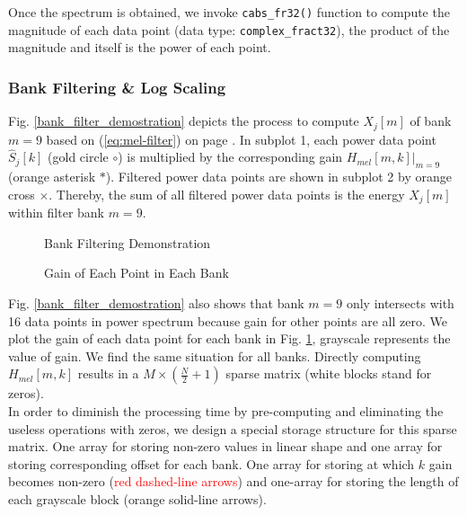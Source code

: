 Once the spectrum is obtained, we invoke \texttt{cabs\_fr32()} function to compute the magnitude of each data point (data type: \texttt{complex\_fract32}), the product of the magnitude and itself is the power of each point.


\subsubsection{Bank Filtering \& Log Scaling}

Fig. \ref{bank_filter_demostration} depicts the process to compute $X_j[m]$ of bank $m = 9$ based on (\ref{eq:mel-filter}) on page \pageref{eq:mel-filter}. In subplot 1, each power data point $\hat{S}_j[k]$ (\textcolor{gold_matlab}{gold circle $\circ$}) is multiplied by the corresponding gain $H_{mel}[m, k]|_{m=9}$ (\textcolor{orange_matlab}{orange asterisk $*$}). Filtered power data points are shown in subplot 2 by \textcolor{orange_matlab}{orange cross $\times$}. Thereby, the sum of all filtered power data points is the energy $X_j[m]$ within filter bank $m = 9$.

\begin{figure}[H]
\begin{minipage}[t]{0.5\linewidth}
\centering
{}
\caption{Bank Filtering Demonstration}
\label{bank_filter_demostration}
\end{minipage}
\begin{minipage}[t]{0.5\linewidth}
\centering
{}
\caption{Gain of Each Point in Each Bank}
\label{mel_filter_bank_gain}
\end{minipage}
\end{figure}

Fig. \ref{bank_filter_demostration} also shows that bank $m=9$ only intersects with 16 data points in power spectrum because gain for other points are all zero. We plot the gain of each data point for each bank in Fig. \ref{mel_filter_bank_gain}, grayscale represents the value of gain. We find the same situation for all banks. Directly computing $H_{mel}[m, k]$ results in a $M \times \left( \frac{N}{2} + 1 \right)$ sparse matrix (white blocks stand for zeros).\\

In order to diminish the processing time by pre-computing and eliminating the useless operations with zeros, we design a special storage structure for this sparse matrix. One array for storing non-zero values in linear shape and one array for storing corresponding offset for each bank. One array for storing at which $k$ gain becomes non-zero (\textcolor{red}{red dashed-line arrows}) and one-array for storing the length of each grayscale block (\textcolor{orange_html}{orange solid-line arrows}).\\

